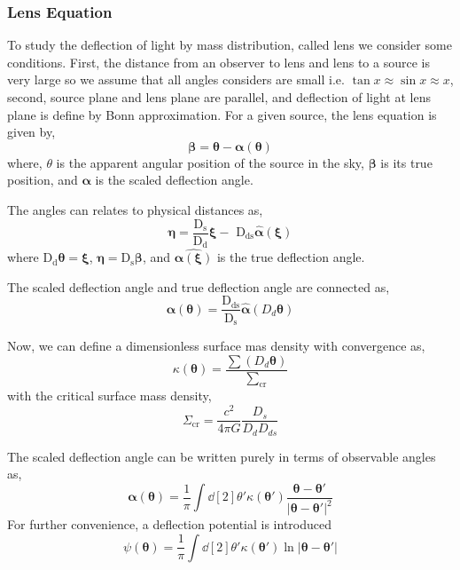 \subsubsection{Lens Equation}
To study the deflection of light by mass distribution, called lens we consider some conditions. First, the distance from an observer to lens and lens to a source is very large so we assume that all angles considers are small i.e. $\tan x \approx \sin x \approx x$, second, source plane and lens plane are parallel, and deflection of light at lens plane is define by Bonn approximation.
For a given source, the lens equation is given by,
\begin{equation}
\pmb\beta =\pmb\theta - \pmb\alpha (\pmb\theta)
\label{LEquation}
\end{equation}
\noindent
where, $\theta$ is the apparent angular position of the source in the sky, $\pmb\beta$ is its true position, and $\pmb\alpha $ is the scaled deflection angle.

The angles can relates to physical distances as,
\begin{equation}
\pmb\eta=\frac{\text{D}_{\text{s}}}{\text{D}_{\text{d}}} \pmb\xi - \text{ D}_{\text{ds}}\hat{\pmb\alpha}(\pmb\xi)
\end{equation}
where $\text{D}_{\text{d}}\pmb\theta =\pmb\xi $, $\pmb\eta= \text{D}_{\text{s}}\pmb\beta $, and $ \hat{\pmb\alpha(\pmb\xi)} $ is the true deflection angle.

The scaled deflection angle and true deflection angle are connected as,
\begin{equation}
\pmb\alpha(\pmb\theta)=\frac{\text{D}_{\text{ds}}}{\text{D}_{\text{s}}} \hat{\pmb\alpha}(D_{d}\pmb\theta)
\end{equation}

Now, we can define a dimensionless surface mas density with convergence as,
\begin{equation}
\kappa(\pmb\theta)=\frac{\sum(D_{d} \pmb \theta)}{\sum_\text{cr}}
\label{Equ:KTheta}
\end{equation}
with the critical surface mass density,
\begin{equation}
\Sigma_\text{cr}=\frac{c^2}{4\pi G}\frac{D_{s}}{D_{d}D_{ds}}
\label{SumCr}
\end{equation}

The scaled deflection angle can be written purely in terms of observable angles as,
\begin{equation}
\pmb\alpha(\pmb\theta)=\frac{1}{\pi}\int \dd[2]{\theta'} \kappa(\pmb{\theta}')\frac{\pmb\theta-\pmb\theta'}{| \pmb\theta -\pmb\theta'| ^2}
\label{ScaledDA}
\end{equation} 
For further convenience, a deflection potential is introduced
\begin{equation}
\psi(\pmb\theta)=\frac{1}{\pi}\int \dd[2]{\theta'} \kappa(\pmb\theta') \ln | \pmb\theta- \pmb\theta'| 
\label{psiTheta}
\end{equation}

